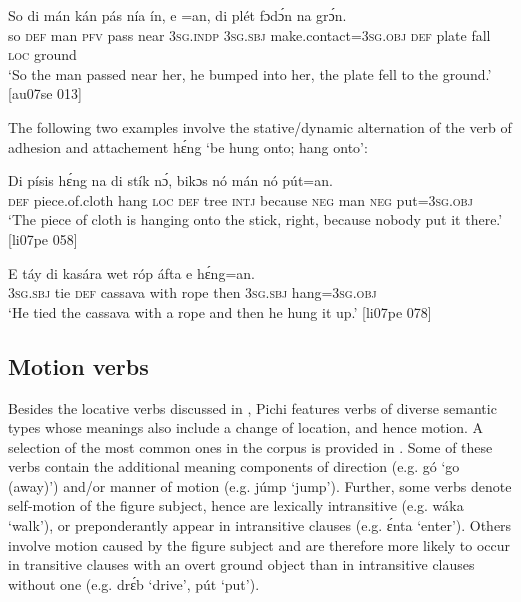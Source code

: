 \ea%
    \label{ex:key:949}
    \gll So  di  mán  kán  pás  nía  ín,    e    =an, 
di  plét    fɔdɔ́n  na  grɔ́n.\\
so  \textsc{def}  man  \textsc{pfv}  pass  near  \textsc{3sg.indp}  \textsc{3sg.sbj}  make.contact=\textsc{3sg.obj} 
\textsc{def}  plate  fall    \textsc{loc}  ground\\

\glt ‘So the man passed near her, he bumped into her, the plate fell 
to the ground.’ [au07se 013]
\z

The following two examples involve the stative/dynamic alternation of the verb of adhesion and attachement hɛ́ng ‘be hung onto; hang onto’:


\ea%
    \label{ex:key:950}
    \gll Di  písis        hɛ́ng  na  di  stík  nɔ́,
bikɔs  nó  mán    nó  pút=an.\\
\textsc{def}  piece.of.cloth    hang  \textsc{loc}  \textsc{def}  tree  \textsc{intj}
because  \textsc{neg}  man    \textsc{neg}  put=\textsc{3sg.obj}\\

\glt ‘The piece of cloth is hanging onto the stick, right, because 
nobody put it there.’ [li07pe 058]
\z


\ea%
    \label{ex:key:951}
    \gll E    táy  di  kasára  wet  róp    áfta    e    hɛ́ng=an.\\
\textsc{3sg.sbj}  tie  \textsc{def}  cassava  with  rope  then  \textsc{3sg.sbj}  hang=\textsc{3sg.obj}\\

\glt ‘He tied the cassava with a rope and then he hung it up.’ [li07pe 078]
\z

\subsection{Motion verbs}\label{sec:8.1.4}

Besides the locative verbs discussed in , Pichi features verbs of diverse semantic types whose meanings also include a change of location, and hence motion. A selection of the most common ones in the corpus is provided in . Some of these verbs contain the additional meaning components of direction (e.g. gó ‘go (away)’) and/or manner of motion{\fff} (e.g. júmp ‘jump’). Further, some verbs denote self-motion of the figure subject, hence are lexically intransitive (e.g. wáka ‘walk’), or preponderantly appear in intransitive clauses (e.g. ɛ́nta ‘enter’). Others involve motion caused by the figure subject and are therefore more likely to occur in transitive clauses with an overt ground object than in intransitive clauses without one (e.g. drɛ́b ‘drive’, pút ‘put’).



